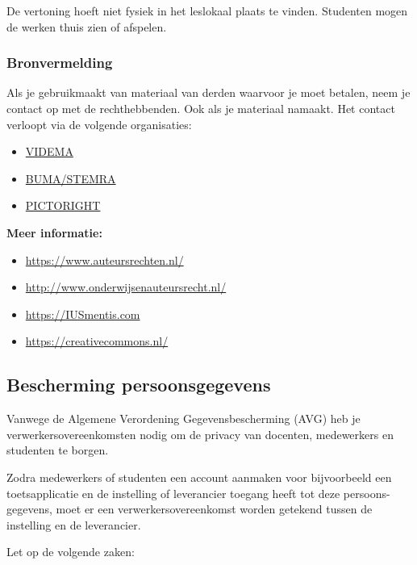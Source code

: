 \documentclass[
]{book}
\providecommand{\tightlist}{%
  \setlength{\itemsep}{0pt}\setlength{\parskip}{0pt}}
\begin{document}
De vertoning hoeft niet fysiek in het leslokaal plaats te vinden. Studenten mogen de werken thuis zien of afspelen.

\hypertarget{bronvermelding}{%
\subsubsection{Bronvermelding}\label{bronvermelding}}

Als je gebruikmaakt van materiaal van derden waarvoor je moet betalen, neem je contact op met de rechthebbenden. Ook als je materiaal namaakt. Het contact verloopt via de volgende organisaties:

\begin{itemize}
\tightlist
\item
  \href{https://www.videma.nl}{VIDEMA}
\item
  \href{http://www.bumastemra.nl}{BUMA/STEMRA}
\item
  \href{http://www.pictoright.nl/auteursrecht/}{PICTORIGHT}
\end{itemize}

\textbf{Meer informatie:}

\begin{itemize}
\tightlist
\item
  \url{https://www.auteursrechten.nl/}
\item
  \url{http://www.onderwijsenauteursrecht.nl/}
\item
  \url{https://IUSmentis.com}
\item
  \url{https://creativecommons.nl/}
\end{itemize}

\hypertarget{bescherming-persoonsgegevens}{%
\subsection{Bescherming persoonsgegevens}\label{bescherming-persoonsgegevens}}

Vanwege de Algemene Verordening Gegevensbescherming (AVG) heb je verwerkersovereenkomsten nodig om de privacy van docenten, medewerkers en studenten te borgen.

Zodra medewerkers of studenten een account aanmaken voor bijvoorbeeld een toetsapplicatie en de instelling of leverancier toegang heeft tot deze persoons- gegevens, moet er een verwerkersovereenkomst worden getekend tussen de instelling en de leverancier.

Let op de volgende zaken:
\end{document}
